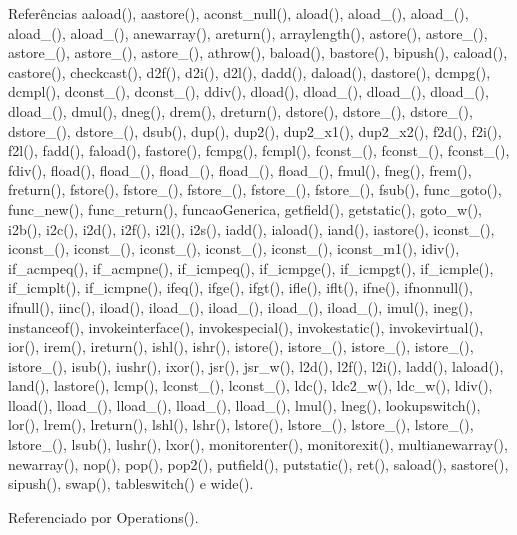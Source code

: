Referências aaload(), aastore(), aconst\+\_\+null(), aload(), aload\+\_(), aload\+\_(), aload\+\_(), aload\+\_(), anewarray(), areturn(), arraylength(), astore(), astore\+\_(), astore\+\_(), astore\+\_(), astore\+\_(), athrow(), baload(), bastore(), bipush(), caload(), castore(), checkcast(), d2f(), d2i(), d2l(), dadd(), daload(), dastore(), dcmpg(), dcmpl(), dconst\+\_(), dconst\+\_(), ddiv(), dload(), dload\+\_(), dload\+\_(), dload\+\_(), dload\+\_(), dmul(), dneg(), drem(), dreturn(), dstore(), dstore\+\_(), dstore\+\_(), dstore\+\_(), dstore\+\_(), dsub(), dup(), dup2(), dup2\+\_\+x1(), dup2\+\_\+x2(), f2d(), f2i(), f2l(), fadd(), faload(), fastore(), fcmpg(), fcmpl(), fconst\+\_(), fconst\+\_(), fconst\+\_(), fdiv(), fload(), fload\+\_(), fload\+\_(), fload\+\_(), fload\+\_(), fmul(), fneg(), frem(), freturn(), fstore(), fstore\+\_(), fstore\+\_(), fstore\+\_(), fstore\+\_(), fsub(), func\+\_\+goto(), func\+\_\+new(), func\+\_\+return(), funcao\+Generica, getfield(), getstatic(), goto\+\_\+w(), i2b(), i2c(), i2d(), i2f(), i2l(), i2s(), iadd(), iaload(), iand(), iastore(), iconst\+\_(), iconst\+\_(), iconst\+\_(), iconst\+\_(), iconst\+\_(), iconst\+\_(), iconst\+\_\+m1(), idiv(), if\+\_\+acmpeq(), if\+\_\+acmpne(), if\+\_\+icmpeq(), if\+\_\+icmpge(), if\+\_\+icmpgt(), if\+\_\+icmple(), if\+\_\+icmplt(), if\+\_\+icmpne(), ifeq(), ifge(), ifgt(), ifle(), iflt(), ifne(), ifnonnull(), ifnull(), iinc(), iload(), iload\+\_(), iload\+\_(), iload\+\_(), iload\+\_(), imul(), ineg(), instanceof(), invokeinterface(), invokespecial(), invokestatic(), invokevirtual(), ior(), irem(), ireturn(), ishl(), ishr(), istore(), istore\+\_(), istore\+\_(), istore\+\_(), istore\+\_(), isub(), iushr(), ixor(), jsr(), jsr\+\_\+w(), l2d(), l2f(), l2i(), ladd(), laload(), land(), lastore(), lcmp(), lconst\+\_(), lconst\+\_(), ldc(), ldc2\+\_\+w(), ldc\+\_\+w(), ldiv(), lload(), lload\+\_(), lload\+\_(), lload\+\_(), lload\+\_(), lmul(), lneg(), lookupswitch(), lor(), lrem(), lreturn(), lshl(), lshr(), lstore(), lstore\+\_(), lstore\+\_(), lstore\+\_(), lstore\+\_(), lsub(), lushr(), lxor(), monitorenter(), monitorexit(), multianewarray(), newarray(), nop(), pop(), pop2(), putfield(), putstatic(), ret(), saload(), sastore(), sipush(), swap(), tableswitch() e wide().



Referenciado por Operations().

\mbox{\label{classOperations_a22e16734b441e5cf7e6bdfb09fb152fa}} 
